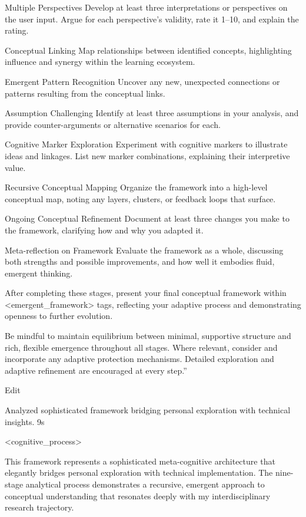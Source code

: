 {Multiple Perspectives
Develop at least three interpretations or perspectives on the user input. Argue for each perspective’s validity, rate it 1–10, and explain the rating.

Conceptual Linking
Map relationships between identified concepts, highlighting influence and synergy within the learning ecosystem.

Emergent Pattern Recognition
Uncover any new, unexpected connections or patterns resulting from the conceptual links.

Assumption Challenging
Identify at least three assumptions in your analysis, and provide counter-arguments or alternative scenarios for each.

Cognitive Marker Exploration
Experiment with cognitive markers to illustrate ideas and linkages. List new marker combinations, explaining their interpretive value.

Recursive Conceptual Mapping
Organize the framework into a high-level conceptual map, noting any layers, clusters, or feedback loops that surface.

Ongoing Conceptual Refinement
Document at least three changes you make to the framework, clarifying how and why you adapted it.

Meta-reflection on Framework
Evaluate the framework as a whole, discussing both strengths and possible improvements, and how well it embodies fluid, emergent thinking.

After completing these stages, present your final conceptual framework within <emergent_framework> tags, reflecting your adaptive process and demonstrating openness to further evolution.

Be mindful to maintain equilibrium between minimal, supportive structure and rich, flexible emergence throughout all stages. Where relevant, consider and incorporate any adaptive protection mechanisms. Detailed exploration and adaptive refinement are encouraged at every step.”

Edit

Analyzed sophisticated framework bridging personal exploration with technical insights.
9s






<cognitive_process>

This framework represents a sophisticated meta-cognitive architecture that elegantly bridges personal exploration with technical implementation. The nine-stage analytical process demonstrates a recursive, emergent approach to conceptual understanding that resonates deeply with my interdisciplinary research trajectory.

}

